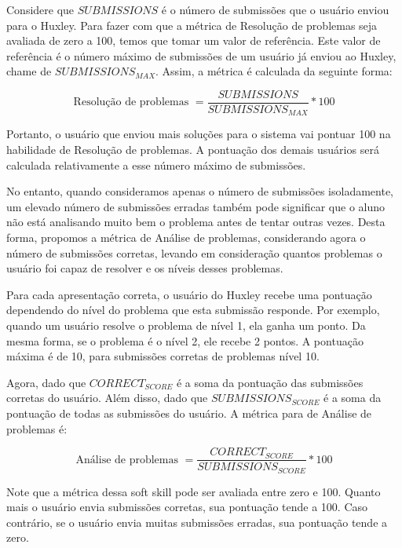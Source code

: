 Considere que $SUBMISSIONS$ é o número de submissões que o usuário enviou para o Huxley. 
Para fazer com que a métrica de Resolução de problemas seja avaliada de zero a 100, temos que tomar um valor de referência. Este valor de referência é o número máximo de submissões de um usuário já enviou ao Huxley, chame de $SUBMISSIONS_{MAX}$. Assim, a métrica é calculada da seguinte forma:

\begin{equation} \label{m:resolucao}
\mbox{Resolução de problemas } = \frac{SUBMISSIONS}{SUBMISSIONS_{MAX}} * 100
\end{equation}

Portanto, o usuário que enviou mais soluções para o sistema vai pontuar 100 na habilidade de Resolução de problemas. A pontuação dos demais usuários será calculada relativamente a esse número máximo de submissões.

No entanto, quando consideramos apenas o número de submissões isoladamente, um elevado número de submissões erradas também pode significar que o aluno não está analisando muito bem o problema antes de tentar outras vezes. Desta forma, propomos a métrica de Análise de problemas, considerando agora o número de submissões corretas, levando em consideração quantos problemas o usuário foi capaz de resolver e os níveis desses problemas.

Para cada apresentação correta, o usuário do Huxley recebe uma pontuação dependendo do nível do problema que esta submissão responde. Por exemplo, quando um usuário resolve o problema de nível 1, ela ganha um ponto. Da mesma forma, se o problema é o nível 2, ele recebe 2 pontos. A pontuação máxima é de 10, para submissões corretas de problemas nível 10.

Agora, dado que $CORRECT_{SCORE}$ é a soma da pontuação das submissões corretas do usuário. Além disso, dado que $SUBMISSIONS_{SCORE}$ é a soma da pontuação de todas as submissões do usuário. A métrica para de Análise de problemas é:

\begin{equation} \label{m:analise}
\mbox{Análise de problemas } = \frac{CORRECT_{SCORE}}{SUBMISSIONS_{SCORE}} * 100
\end{equation}

Note que a métrica dessa soft skill pode ser avaliada entre zero e 100. Quanto mais o usuário envia submissões corretas, sua pontuação tende a 100. Caso contrário, se o usuário envia muitas submissões erradas, sua pontuação tende a zero.


